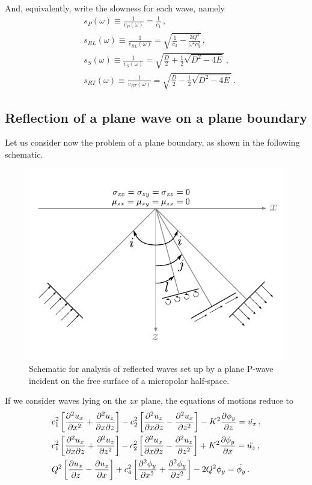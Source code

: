 \documentclass[12pt]{article}
\begin{document}
And, equivalently, write the slowness for each wave, namely
\begin{align}
&s_P(\omega) \equiv \frac{1}{v_P(\omega)} = \frac{1}{c_1}\, ,\\
&s_{RL}(\omega) \equiv \frac{1}{v_{RL}(\omega)} = \sqrt{\frac{1}{c_3} - \frac{2Q^2}{\omega^2 c_3^2}}\, ,\\
&s_S(\omega)\equiv \frac{1}{v_S(\omega)} = \sqrt{\frac{D}{2} + \frac{1}{2} \sqrt{D^2 - 4E}}\, ,\\
&s_{RT}(\omega) \equiv \frac{1}{v_{RT}(\omega)} = \sqrt{\frac{D}{2} - \frac{1}{2} \sqrt{D^2 - 4E}}\, .
\end{align}

\subsection{Reflection of a plane wave on a plane boundary}
Let us consider now the problem of a plane boundary, as shown in the following schematic.
\begin{figure}[h]
  \centering
  \includegraphics[scale=1]{img/reflection_schematic.pdf}
  \caption{Schematic for analysis of reflected waves set up by a plane P-wave incident on the free surface of a micropolar half-space.}
  \label{fig:reflection_schematic}
\end{figure}

If we consider waves lying on the \(zx\) plane, the equations of motions reduce to
\begin{align*}
&c_1^2\left[\pdv[2]{u_x}{x} + \pdv{u_z}{x}{z}\right] - c_2^2\left[\pdv{u_z}{x}{z} - \pdv[2]{u_x}{z}\right] - K^2\pdv{\phi_y}{z} = \ddot{u_x}\, ,\\
&c_1^2\left[\pdv{u_x}{x}{z} + \pdv[2]{u_z}{z}\right] - c_2^2\left[\pdv{u_x}{x}{z} - \pdv[2]{u_z}{z}\right] + K^2\pdv{\phi_y}{x} = \ddot{u_z}\, ,\\
&Q^2\left[\pdv{u_x}{z} - \pdv{u_z}{x}\right] + c_4^2\left[\pdv[2]{\phi_y}{x} + \pdv[2]{\phi_y}{z}\right] - 2Q^2\phi_y = \ddot{\phi_y}\, .
\end{align*}
\end{document}
